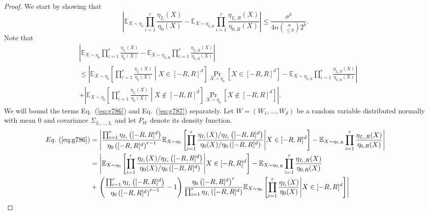 \documentclass[final, 12pt]{colt2018}
\renewcommand{\eqref}[1]{Eq.~(\ref{#1})}
\begin{document}
\begin{proof}
We start by showing that 
\begin{equation}\label{eq:app-aux}
\left\lvert \mathbb{E}_{X\sim \eta_0} \prod_{i=1}^r \frac{\eta_{I_i}(X)}{\eta_0(X)} 
-  \mathbb{E}_{X\sim \eta_{0,R}} \prod_{i=1}^r  \frac{\eta_{I_i,R}(X)}{\eta_{0,R}(X)} \right\rvert
\le \frac{\sigma^b}{4n {\binom{n}{\le b}} 2^b}.
\end{equation}
Note that
\begin{align}
&\left\lvert \mathbb{E}_{X\sim \eta_0} \prod_{i=1}^r \frac{\eta_{I_i}(X)}{\eta_0(X)} - \mathbb{E}_{X\sim \eta_{0,R}} \prod_{i=1}^r  \frac{\eta_{I_i,R}(X)}{\eta_{0,R}(X)}\right\rvert\label{eq:g633}\\
&\le \left\lvert \mathbb{E}_{X\sim \eta_0}\left[ \prod_{i=1}^r \frac{\eta_{I_i}(X)}{\eta_0(X)} \middle| X \in [-R,R]^d \right] \Pr_{X \sim \eta_0}\left[X \in [-R,R]^d\right] - \mathbb{E}_{X\sim \eta_{0,R}} \prod_{i=1}^r  \frac{\eta_{I_i,R}(X)}{\eta_{0,R}(X)} \right\rvert \label{eq:g786} \\
&+ \left\lvert \mathbb{E}_{X\sim \eta_0}\left[ \prod_{i=1}^r \frac{\eta_{I_i}(X)}{\eta_0(X)} \middle| X \notin [-R,R]^d \right] \Pr_{X \sim \eta_0}\left[X \notin [-R,R]^d\right] \right\rvert\label{eq:g787}.
\end{align}
We will bound the terms \eqref{eq:g786} and \eqref{eq:g787} separately. Let $W=(W_1,\dots,W_d)$ be a random variable distributed normally with mean $0$ and covariance $\Sigma_{I_1,\dots,I_r}$ and let $P_W$ denote its density function.
\begin{align}
\eqref{eq:g786}
&= \left\lvert \frac{\prod_{i=1}^r \eta_{I_i}\left([-R,R]^d\right)}{\eta_0\left([-R,R]^d\right)^{r-1}}\mathbb{E}_{X\sim \eta_0}\left[ \prod_{i=1}^r \frac{\eta_{I_i}(X) / \eta_{I_i}\left([-R,R]^d\right)}{\eta_0(X)/\eta_0\left([-R,R]^d\right)} \middle| X \in [-R,R]^d \right] 
- \mathbb{E}_{X\sim \eta_{0,R}} \prod_{i=1}^r  \frac{\eta_{I_i,R}(X)}{\eta_{0,R}(X)}\right\rvert\\
&=\left\lvert \mathbb{E}_{X\sim \eta_0}\left[ \prod_{i=1}^r \frac{\eta_{I_i}(X) / \eta_{I_i}\left([-R,R]^d\right)}{\eta_0(X)/\eta_0\left([-R,R]^d\right)} \middle| X \in [-R,R]^d \right] - \mathbb{E}_{X\sim \eta_{0,R}} \prod_{i=1}^r  \frac{\eta_{I_i,R}(X)}{\eta_{0,R}(X)} \right. \notag\\
&+ \left. \left( \frac{\prod_{i=1}^r \eta_{I_i}\left([-R,R]^d\right)}{\eta_0\left([-R,R]^d\right)^{r-1}}-1 \right) 
\frac{\eta_0\left([-R,R]^d\right)^r}{\prod_{i=1}^r \eta_{I_i}\left([-R,R]^d\right)}
\mathbb{E}_{X\sim \eta_0}\left[ \prod_{i=1}^r \frac{\eta_{I_i}(X)}{\eta_0(X)} \middle| X \in [-R,R]^d \right] \right\rvert \notag\\

\end{align}
\end{proof}
\end{document}
